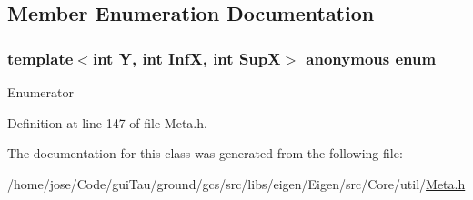\subsection{Member Enumeration Documentation}
\hypertarget{classei__meta__sqrt_3_01_y_00_01_inf_x_00_01_sup_x_00_01true_01_4_a710aa0ac6ad81bd736e56f37165c4cba}{\subsubsection[{anonymous enum}]{\setlength{\rightskip}{0pt plus 5cm}template$<$int Y, int Inf\-X, int Sup\-X$>$ anonymous enum}}\label{classei__meta__sqrt_3_01_y_00_01_inf_x_00_01_sup_x_00_01true_01_4_a710aa0ac6ad81bd736e56f37165c4cba}
\begin{Desc}
\item[Enumerator]\par
\begin{description}
\item[{\em 
\hypertarget{classei__meta__sqrt_3_01_y_00_01_inf_x_00_01_sup_x_00_01true_01_4_a710aa0ac6ad81bd736e56f37165c4cbaa90487774a782231f8aa0bf01810b5507}{ret}\label{classei__meta__sqrt_3_01_y_00_01_inf_x_00_01_sup_x_00_01true_01_4_a710aa0ac6ad81bd736e56f37165c4cbaa90487774a782231f8aa0bf01810b5507}
}]\end{description}
\end{Desc}


Definition at line 147 of file Meta.\-h.



The documentation for this class was generated from the following file\-:\begin{DoxyCompactItemize}
\item 
/home/jose/\-Code/gui\-Tau/ground/gcs/src/libs/eigen/\-Eigen/src/\-Core/util/\hyperlink{_meta_8h}{Meta.\-h}\end{DoxyCompactItemize}
